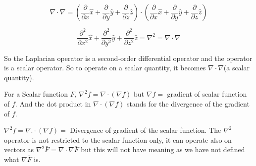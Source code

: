 \begin{dmath}
\nabla \cdot \nabla =  \left(\frac{\partial  }{\partial x}\hat x + \frac{\partial  }{\partial y}\hat y + \frac{\partial  }{\partial z}\hat z \right) \cdot \left( \frac{\partial  }{\partial x}\hat x + \frac{\partial  }{\partial y}\hat y + \frac{\partial  }{\partial z}\hat z\right)
\end{dmath}

\begin{dmath}
\frac{\partial^{2}  }{\partial x^{2}}\hat x + \frac{\partial^{2}  }{\partial y^{2}}\hat y + \frac{\partial^{2}  }{\partial z^{2}}\hat z = \nabla^{2} = \nabla \cdot \nabla
\end{dmath}

So the Laplacian operator is a second-order differential operator and the operator is a scalar operator. So to operate on a scalar quantity, it becomes $\nabla\cdot\nabla$(a scalar quantity).

For a Scalar function $F$, $\nabla^2f = \nabla \cdot (\nabla f)$ but $\nabla f =$ gradient of scalar function of $f$. And the dot product in $\nabla \cdot (\nabla f) $ stands for the divergence of the gradient of $f$.

$\nabla^2 f= \nabla .\cdot (\nabla f) =$ Divergence of gradient of the scalar function. The $\nabla^2 $ operator is not restricted to the scalar function only, it can operate also on vectors as $\nabla^2 \bar{F} = \nabla \cdot \nabla \bar{F}$ but this will not have meaning as we have not defined what $\nabla \bar{F}$ is.


